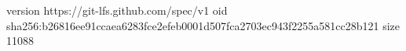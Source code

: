 version https://git-lfs.github.com/spec/v1
oid sha256:b26816ee91ccaea6283fce2efeb0001d507fca2703ec943f2255a581cc28b121
size 11088
